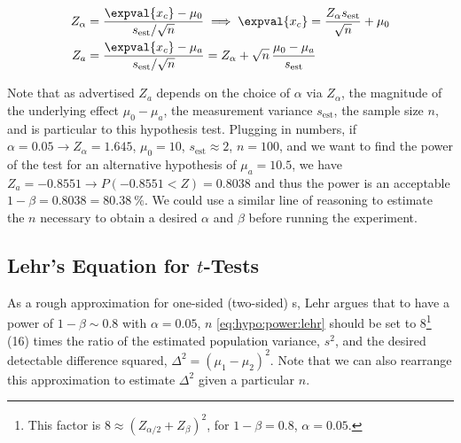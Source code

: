 \begin{subequations}\label{eq:hypo:power_ex}
\begin{align}
Z_{\alpha} &= \frac{\expval{x_{c}} - \mu_{0}}{s_{\text{est}} / \sqrt{n}} \implies
\expval{x_{c}} = \frac{Z_{\alpha} s_{\text{est}}}{\sqrt{n}} + \mu_{0} \label{eq:hypo:power_ex:x_c} \\
Z_{a} &= \frac{\expval{x_{c}} - \mu_{a}}{s_{\text{est}} / \sqrt{n}}
= Z_{\alpha} + \sqrt{n}\,\frac{\mu_{0} - \mu_{a}}{s_{\text{est}}} \label{eq:hypo:power_ex:Z_a}
\end{align}
\end{subequations}

Note that as advertised $Z_{a}$ depends on
the choice of $\alpha$ via $Z_{\alpha}$,
the magnitude of the underlying effect $\mu_{0} - \mu_{a}$,
the measurement variance $s_{\text{est}}$,
the sample size $n$,
and is particular to this hypothesis test.
Plugging in numbers, if
$\alpha = \num{0.05} \to Z_{\alpha} = \num{1.645}$,
$\mu_{0} = \num{10}$,
$s_{\text{est}} \approx \num{2}$,
$n = \num{100}$,
and we want to find the power of the test for an alternative hypothesis of $\mu_{a} = \num{10.5}$,
we have $Z_{a} = \num{-0.8551} \to P\left(\num{-0.8551} < Z\right) = \num{0.8038}$
and thus the power is an acceptable $1-\beta = \num{0.8038} = \SI{80.38}{\percent}$.
We could use a similar line of reasoning to estimate
the $n$ necessary to obtain a desired $\alpha$ and $\beta$ before running the experiment.


\subsection{Lehr's Equation for \texorpdfstring{$t$}{t}-Tests}
\label{hypo:power:lehr}

As a rough approximation for one-sided (two-sided) {\ttest}s,
Lehr argues that to have a power of $1-\beta \sim \num{0.8}$ with $\alpha = \num{0.05}$,
$n$ \cref{eq:hypo:power:lehr} should be set to 8\footnote{This
factor is $8 \approx \left(Z_{\alpha/2} + Z_{\beta}\right)^{2}$, for $1-\beta = \num{0.8}$, $\alpha = \num{0.05}$.} (16)
times the ratio of the estimated population variance, $s^{2}$,
and the desired detectable difference squared, $\Delta^{2} = \left(\mu_{1} - \mu_{2}\right)^{2}$.
Note that we can also rearrange this approximation to estimate $\Delta^{2}$ given a particular $n$.

